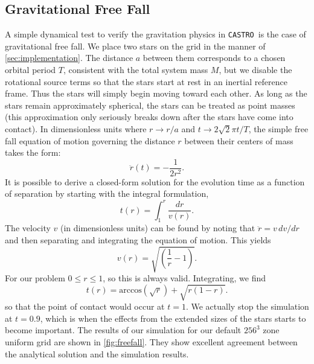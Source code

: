 \documentclass[iop]{../emulateapj}
\newcommand{\castro}{\texttt{CASTRO}}
\begin{document}
\subsection{Gravitational Free Fall}\label{sec:Gravitational Free Fall}

A simple dynamical test to verify the gravitation physics in \castro\ is
the case of gravitational free fall. We place two stars on the grid 
in the manner of \autoref{sec:implementation}. The distance $a$ between 
them corresponds to a chosen orbital period $T$, consistent with the total
system mass $M$, but we disable the rotational source terms so that 
the stars start at rest in an inertial reference frame. 
Thus the stars will simply begin moving toward each other.
As long as the stars remain approximately spherical, the stars can be 
treated as point masses (this approximation only seriously breaks down after the stars
have come into contact). In dimensionless units where $r \to r / a$ and 
$t \to 2\sqrt{2}\pi t / T$, the simple free fall equation of motion governing the
distance $r$ between their centers of mass takes the form:
\begin{equation}
  \ddot{r}(t) = - \frac{1}{2r^2}.
\end{equation}
It is possible to derive a closed-form solution for the evolution time
as a function of separation by starting with the integral formulation,
\begin{equation}
  t(r) = \int_{1}^{r} \frac{dr}{v(r)}.
\end{equation}
The velocity $v$ (in dimensionless units) can be found by noting that 
$\ddot{r} = v\, dv / dr$ and then separating and integrating the equation 
of motion. This yields 
\begin{equation}
  v(r) = \sqrt{\left(\frac{1}{r} - 1\right)}.
\end{equation}
For our problem $0 \leq r \leq 1$, so this is always valid. Integrating, we find
\begin{equation}
  t(r) = \text{arccos}\left(\sqrt{r}\right) + \sqrt{r \left(1 - r\right)}. \label{analyticalFreeFall}
\end{equation}
so that the point of contact would occur at $t = 1$. We actually stop the simulation
at $t = 0.9$, which is when the effects from the extended sizes of the stars
starts to become important. The results of our simulation for our default $256^3$ zone 
uniform grid are shown in \autoref{fig:freefall}. They show excellent agreement
between the analytical solution and the simulation results.
\end{document}
